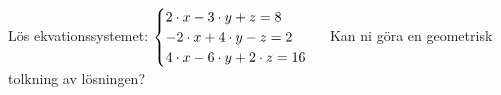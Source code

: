 Lös ekvationssystemet: 
\begin{math}
	\begin{cases}
	2 \cdot x - 3 \cdot y  + z = 8 \\
	-2 \cdot x + 4 \cdot y -z = 2 \\
	4 \cdot x - 6 \cdot y  + 2 \cdot z = 16 \\
	\end{cases}
	\\
	\\
\end{math}
Kan ni göra en geometrisk tolkning av lösningen?